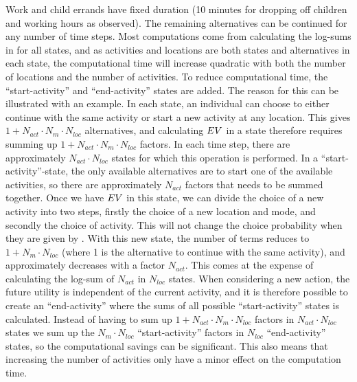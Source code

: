 Work and child errands have fixed duration (10 minutes for dropping off children and working hours as observed). The remaining alternatives can be continued for any number of time steps. Most computations come from calculating the log-sums in  for all states, and as activities and locations are both states and alternatives in each state, the computational time will increase quadratic with both the number of locations and the number of activities. To reduce computational time, the ``start-activity'' and ``end-activity'' states are added. The reason for this can be illustrated with an example. In each state, an individual can choose to either continue with the same activity or start a new activity at any location. This gives $1 + N_{act}\cdot N_{m}\cdot N_{loc}$ alternatives, and calculating $EV$ in a state therefore requires summing up $1 + N_{act}\cdot N_{m}\cdot N_{loc}$ factors. In each time step, there are approximately $N_{act}\cdot N_{loc}$ states for which this operation is performed. In a ``start-activity''-state, the only available alternatives are to start one of the available activities, so there are approximately $N_{act}$ factors that needs to be summed together. Once we have $EV$ in this state, we can divide the choice of a new activity into two steps, firstly the choice of a new location and mode, and secondly the choice of activity. This will not change the choice probability when they are given by . With this new state, the number of terms reduces to $1 + N_{m}\cdot N_{loc}$ (where 1 is the alternative to continue with the same activity), and approximately decreases with a factor $N_{act}$. This comes at the expense of calculating the log-sum of $N_{act}$ in $N_{loc}$ states. When considering a new action, the future utility is independent of the current activity, and it is therefore possible to create an ``end-activity'' where the sums of all possible ``start-activity'' states is calculated. Instead of having to sum up $1 + N_{act}\cdot N_{m}\cdot N_{loc}$ factors in $N_{act}\cdot N_{loc}$ states we sum up the $N_{m}\cdot N_{loc}$ ``start-activity'' factors in $N_{loc}$ ``end-activity'' states, so the computational savings can be significant. This also means that increasing the number of activities only have a minor effect on the computation time.

